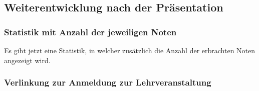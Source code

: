 \documentclass[a4paper,10pt]{scrartcl}
\begin{document}
\noindent{}
\medskip

\subsection{Weiterentwicklung nach der Präsentation}

\subsubsection*{Statistik mit Anzahl der jeweiligen Noten}

Es gibt jetzt eine Statistik, in welcher zusätzlich die Anzahl der erbrachten Noten angezeigt wird.

\noindent{}
\medskip

\subsubsection*{Verlinkung zur Anmeldung zur Lehrveranstaltung}
\end{document}
